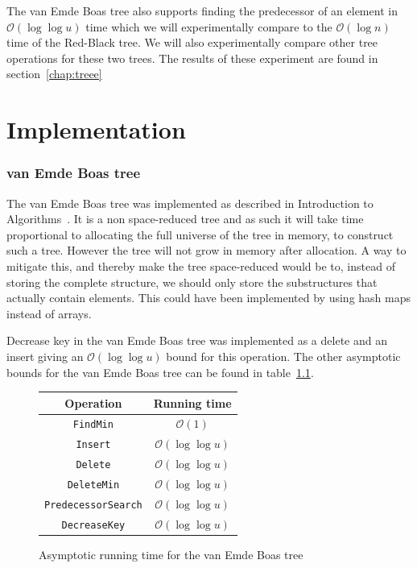 \documentclass[a4paper,oneside,article,11pt]{memoir}
\begin{document}
The van Emde Boas tree also supports finding the predecessor of an element in $\mathcal{O}(\log\log u)$ time which we will experimentally compare to the $\mathcal{O}(\log n)$ time of the Red-Black tree. We will also experimentally compare other tree operations for these two trees. The results of these experiment are found in section~\ref{chap:treee}
\chapter{Implementation}
\label{cpt:implementation}


\subsection{van Emde Boas tree}
The van Emde Boas tree was implemented as described in Introduction to Algorithms~\cite{clrs}. It is a non space-reduced tree and as such it will take time proportional to allocating the full universe of the tree in memory, to construct such a tree. However the tree will not grow in memory after allocation. A way to mitigate this, and thereby make the tree space-reduced would be to, instead of storing the complete structure, we should only store the substructures that actually contain elements. This could have been implemented by using hash maps instead of arrays.

Decrease key in the van Emde Boas tree was implemented as a delete and an insert giving an $\mathcal{O}(\log\log u)$ bound for this operation. The other asymptotic bounds for the van Emde Boas tree can be found in table~\ref{tab:van_emde_boas}.
\begin{figure}[H]
\begin{center}
\begin{tabular}{c|c}
Operation & Running time \\\hline
\texttt{FindMin} & $\mathcal{O}(1)$ \\\hline
\texttt{Insert} & $\mathcal{O}(\log\log u)$ \\\hline
\texttt{Delete} & $\mathcal{O}(\log\log u)$ \\\hline
\texttt{DeleteMin} & $\mathcal{O}(\log\log u)$ \\\hline
\texttt{PredecessorSearch} & $\mathcal{O}(\log\log u)$ \\\hline
\texttt{DecreaseKey} & $\mathcal{O}(\log\log u)$
\end{tabular}
\end{center}
\caption{Asymptotic running time for the van Emde Boas tree}
\label{tab:van_emde_boas}
\end{figure}
\end{document}

